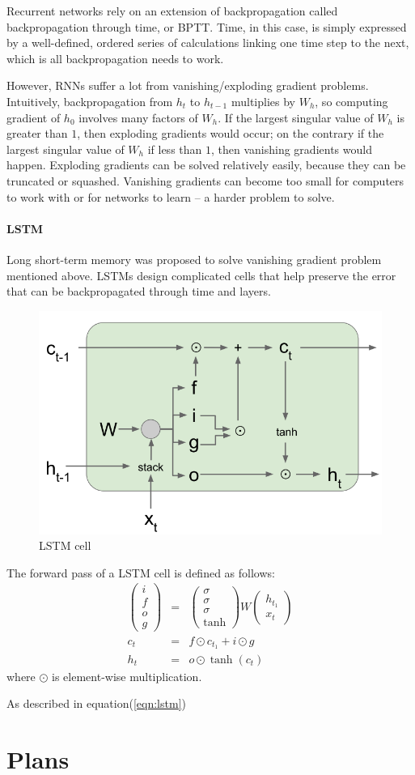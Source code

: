 \documentclass{article} %
\begin{document}
Recurrent networks rely on an extension of backpropagation called backpropagation through time, or BPTT. Time, in this case, is simply expressed by a well-defined, ordered series of calculations linking one time step to the next, which is all backpropagation needs to work.

However, RNNs suffer a lot from vanishing/exploding gradient problems. Intuitively, backpropagation from $h_t$ to $h_{t-1}$ multiplies by $W_h$, so computing gradient of $h_0$ involves many factors of $W_h$. If the largest singular value of $W_h$ is greater than $1$, then exploding gradients would occur; on the contrary if the largest singular value of $W_h$ if less than $1$, then vanishing gradients would happen. Exploding gradients can be solved relatively easily, because they can be truncated or squashed. Vanishing gradients can become too small for computers to work with or for networks to learn – a harder problem to solve. 

\paragraph{LSTM}
Long short-term memory was proposed to solve vanishing gradient problem mentioned above. LSTMs design complicated cells that help preserve the error that can be backpropagated through time and layers.

\begin{figure}[H]
	\centering
	\includegraphics[width=.6\textwidth]{lstm.png}
	\caption{LSTM cell}
\end{figure}

The forward pass of a LSTM cell is defined as follows:
\begin{eqnarray}
\left(\begin{array}{c} i\\f\\o\\g \end{array}\right) &=& \left(\begin{array}{c} \sigma\\\sigma\\\sigma\\\tanh \end{array}\right) W \left(\begin{array}{c} h_{t_1}\\x_t \end{array}\right)  \label{eqn:lstm} \\
\nonumber c_t &=& f \odot c_{t_1} + i \odot g\\
\nonumber h_t &=& o \odot \tanh(c_t)

\end{eqnarray}
where $\odot$ is element-wise multiplication.

As described in equation(\ref{eqn:lstm})


\section{Plans}
\end{document}
